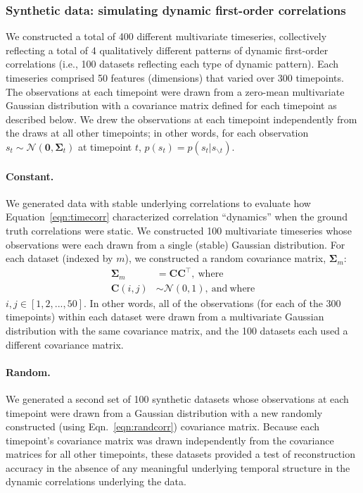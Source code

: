 \documentclass[english]{article}
\begin{document}
\subsubsection*{Synthetic data: simulating dynamic first-order correlations}
We constructed a total of 400 different multivariate timeseries,
collectively reflecting a total of 4 qualitatively different patterns
of dynamic first-order correlations (i.e., 100 datasets reflecting each type of
dynamic pattern).  Each timeseries comprised 50 features (dimensions)
that varied over 300 timepoints.  The observations at each timepoint
were drawn from a zero-mean multivariate Gaussian distribution with a
covariance matrix defined for each timepoint as described below.  We
drew the observations at each timepoint independently from the draws
at all other timepoints; in other words, for each observation
$s_t \sim \mathcal{N}\left(\mathbf{0}, \mathbf{\Sigma}_t\right)$ at
timepoint $t$, $p(s_t) = p(s_t | s_{\backslash t})$.

\paragraph*{Constant.}  We generated data with stable underlying
correlations to evaluate how Equation~\ref{eqn:timecorr} characterized
correlation ``dynamics'' when the ground truth correlations were
static.  We constructed 100 multivariate timeseries whose observations
were each drawn from a single (stable) Gaussian distribution.  For
each dataset (indexed by $m$), we constructed a random covariance matrix,
$\mathbf{\Sigma}_m$:
\begin{align}
   \mathbf{\Sigma}_m &= \mathbf{C}
                                          \mathbf{C}^\top\mathrm{,~where}\label{eqn:randcorr}\\
  \mathbf{C}(i, j) &\sim \mathcal{N}(0, 1)\mathrm{,~and~where}
  \end{align}
  $i, j \in \left[1, 2, ..., 50 \right]$.  In other words, all of the
  observations (for each of the 300 timepoints) within each dataset
  were drawn from a multivariate Gaussian distribution with the same
  covariance matrix, and the 100 datasets each used a different
  covariance matrix.
  
  \paragraph*{Random.}  We generated a second set of 100 synthetic
  datasets whose observations at each timepoint were drawn from a
  Gaussian distribution with a new randomly constructed (using
  Eqn.~\ref{eqn:randcorr}) covariance matrix.  Because each
  timepoint's covariance matrix was drawn independently from the
  covariance matrices for all other timepoints, these datasets
  provided a test of reconstruction accuracy in the absence of any
  meaningful underlying temporal structure in the dynamic correlations
  underlying the data.
  
\end{document}
